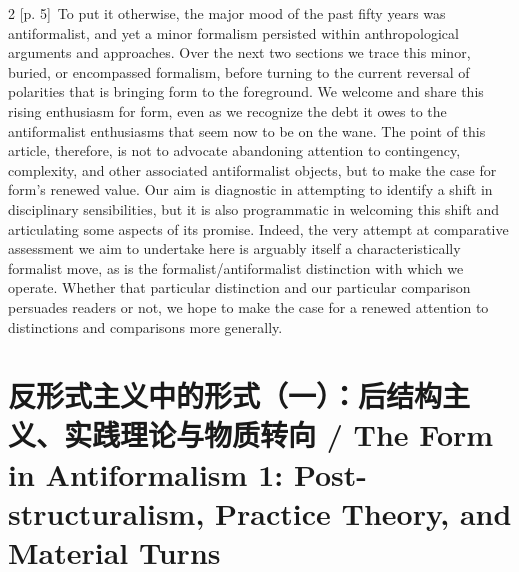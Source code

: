 \documentclass[10pt,a4paper]{article}
\begin{document}
\begin{paracol}{2}
{\scriptsize\color{gray} [p. 5]}\ To put it otherwise, the major mood of the past fifty years was antiformalist, and yet a minor formalism persisted within anthropological arguments and approaches. Over the next two sections we trace this minor, buried, or encompassed formalism, before turning to the current reversal of polarities that is bringing form to the foreground. We welcome and share this rising enthusiasm for form, even as we recognize the debt it owes to the antiformalist enthusiasms that seem now to be on the wane. The point of this article, therefore, is not to advocate abandoning attention to contingency, complexity, and other associated antiformalist objects, but to make the case for form’s renewed value. Our aim is diagnostic in attempting to identify a shift in disciplinary sensibilities, but it is also programmatic in welcoming this shift and articulating some aspects of its promise. Indeed, the very attempt at comparative assessment we aim to undertake here is arguably itself a characteristically formalist move, as is the formalist/antiformalist distinction with which we operate. Whether that particular distinction and our particular comparison persuades readers or not, we hope to make the case for a renewed attention to distinctions and comparisons more generally.\par
\switchcolumn*
\end{paracol}
\section*{反形式主义中的形式（一）：后结构主义、实践理论与物质转向 / The Form in Antiformalism 1: Post-structuralism, Practice Theory, and Material Turns}
\end{document}
